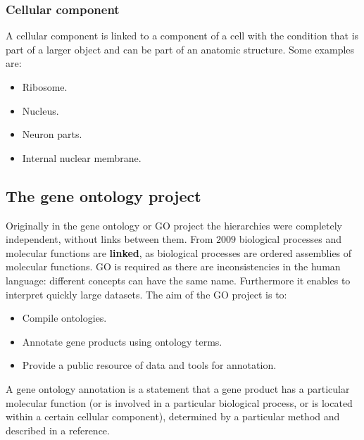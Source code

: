		\subsubsection{Cellular component}
		A cellular component is linked to a component of a cell with the condition that is part of a larger object and can be part of an anatomic structure.
		Some examples are:

		\begin{multicols}{4}
			\begin{itemize}
				\item Ribosome.
				\item Nucleus.
				\item Neuron parts.
				\item Internal nuclear membrane.
			\end{itemize}
		\end{multicols}
		

	\subsection{The gene ontology project}
	Originally in the gene ontology or GO project the hierarchies were completely independent, without links between them.
	From $2009$ biological processes and molecular functions are \textbf{linked}, as biological processes are ordered assemblies of molecular functions.
	GO is required as there are inconsistencies in the human language: different concepts can have the same name.
	Furthermore it enables to interpret quickly large datasets.
	The aim of the GO project is to:

	\begin{multicols}{3}
		\begin{itemize}
			\item Compile ontologies.
			\item Annotate gene products using ontology terms.
			\item Provide a public resource of data and tools for annotation.
		\end{itemize}
	\end{multicols}

	A gene ontology annotation is a statement that a gene product has a particular molecular function (or is involved in a particular biological process, or is located within a certain cellular component), determined by a particular method and described in a reference.
	
	
	
	
	

